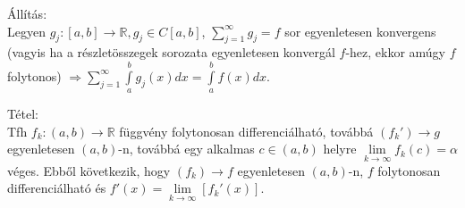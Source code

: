 \documentclass[12pt,a4paper]{scrartcl}
\begin{document}
\begin{all_extra}

Állítás:\\
Legyen
\(\left. g_{j}:\left\lbrack {a,b} \right\rbrack\rightarrow{\mathbb{R}},g_{j} \in C\left\lbrack {a,b} \right\rbrack \right.\),
\({\sum\limits_{j = 1}^{\infty}g_{j}} = f\) sor egyenletesen konvergens
(vagyis ha a részletösszegek sorozata egyenletesen konvergál \(f\)-hez,
ekkor amúgy \(f\) folytonos)
\(\left. \Rightarrow{\sum\limits_{j = 1}^{\infty}{{\int\limits_{a}^{b}{g_{j}\left( x \right)dx}} = {\int\limits_{a}^{b}{f\left( x \right)dx}}}} \right.\).

\end{all_extra}

\begin{tetel_extra}

Tétel:\\
Tfh \(\left. f_{k}:\left( {a,b} \right)\rightarrow{\mathbb{R}} \right.\)
függvény folytonosan differenciálható, továbbá
\(\left. \left( {f_{k}'} \right)\rightarrow g \right.\) egyenletesen
\(\left( {a,b} \right)\)-n, továbbá egy alkalmas
\(c \in \left( {a,b} \right)\) helyre
\(\underset{k\rightarrow\infty}{\lim}f_{k}\left( c \right) = \alpha\)
véges. Ebből következik, hogy
\(\left. \left( f_{k} \right)\rightarrow f \right.\) egyenletesen
\(\left( {a,b} \right)\)-n, \(f\) folytonosan differenciálható és
\(f'\left( x \right) = \underset{k\rightarrow\infty}{\lim}\left\lbrack {f_{k}'\left( x \right)} \right\rbrack\).

\end{tetel_extra}
\end{document}
